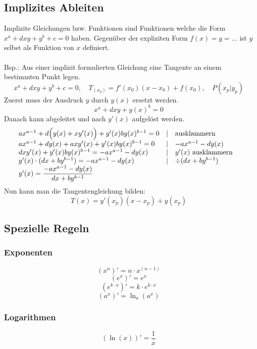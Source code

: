 \subsection{Implizites Ableiten}
Implizite Gleichungen bzw. Funktionen sind Funktionen welche die Form $x^a + d x y + y^b + c= 0$ haben.
Gegenüber der expliziten Form $f(x)=y=...$ ist $y$ selbst als Funktion von $x$ definiert.\\\\
Bsp.: Aus einer implizit formulierten Gleichung eine Tangente an einem bestimmten Punkt legen.
\[ x^a + d x y + y^b + c = 0, \quad T_{(x_0)} = f'(x_0)(x-x_0)+f(x_0), \quad P(x_p|y_p) \]
Zuerst muss der Ausdruck $y$ durch $y(x)$ ersetzt werden.
\[ x^a + d x y + y(x)^b = 0\]
Danach kann abgeleitet und nach $y'(x)$ aufgelöst werden.
\[ \begin{array}{lll@{\quad}}
ax^{a-1} + d\Big(y(x) + xy'(x)\Big) + y'(x)by(x)^{b-1} =0 & |& \text{ausklammern} \\ 
ax^{a-1} + dy(x) + axy'(x) + y'(x)by(x)^{b-1} =0          & |& -ax^{a-1} - dy(x) \\
dxy'(x) + y'(x) by(x)^{b-1} = -ax^{a-1} - dy(x)           & |& y'(x) \text{ ausklammern } \\
y'(x) \cdot (dx + by^{b-1}) = -ax^{a-1} - dy(x)           & |& \div (dx+by^{b-1}) \\
y'(x) = \dfrac{-ax^{a-1} - dy(x)}{dx + by^{b-1}}          &  & \\
\end{array} \]
Nun kann man die Tangentengleichung bilden:
\[ T(x) = y'(x_p) (x-x_p) + y(x_p) \]

\newpage

\subsection{Spezielle Regeln}

\subsubsection{Exponenten}
\[ \boxed{ (x^n)' = n\cdot x^{(n-1)} } \]
\[ \boxed{ (e^x)' = e^x } \]
\[ \boxed{ (e^{k\cdot x})' = k \cdot e^{k\cdot x} } \]
\[ \boxed{ (a^x)' = \ln_a (a^x) } \]

\subsubsection{Logarithmen}
\[ \boxed{ (\ln(x))' = \frac{1}{x} } \]  

